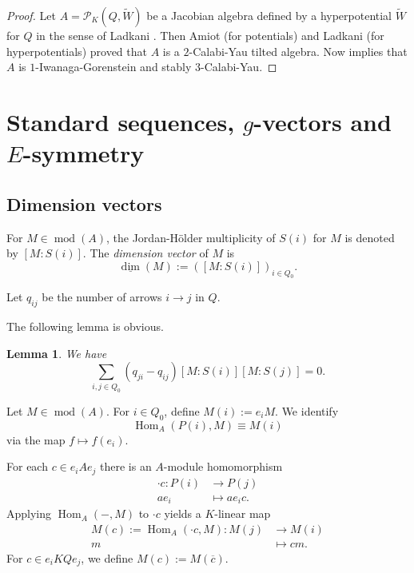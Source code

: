 \documentclass[12pt,reqno]{amsart}
\newtheorem{Lem}[Thm]{Lemma}
\theoremstyle{definition}
\newcommand{\df}{\colon}
\newcommand{\cP}{{\mathcal P}}
\newcommand{\md}{\operatorname{mod}}
\newcommand{\Jacobi}{\cP}
\newcommand{\dimv}{\underline{\dim}}
\newcommand{\Hom}{\operatorname{Hom}}
\begin{document}
\begin{proof}
Let $A = \Jacobi_K(Q,\tilde{W})$ be a Jacobian algebra defined
by a hyperpotential $\tilde{W}$ for $Q$ in the sense of Ladkani \cite{L14}.
Then Amiot \cite[Corollary~3.6]{A09}  (for potentials)
and Ladkani \cite[Section~1.1]{L14} (for hyperpotentials) 
proved that $A$ is a $2$-Calabi-Yau tilted algebra.
Now \cite[Proposition~2.1(d) and Theorem~3.3]{KR07} implies that $A$ is $1$-Iwanaga-Gorenstein and stably
$3$-Calabi-Yau.
\end{proof}



\section{Standard sequences, $g$-vectors and $E$-symmetry}
\label{sec:2}



\subsection{Dimension vectors}
For $M \in \md(A)$, the Jordan-H\"older multiplicity of $S(i)$ 
for $M$ is denoted by $[M:S(i)]$.
The \emph{dimension vector} of $M$ is
$$
\dimv(M) := ([M:S(i)])_{i \in Q_0}.
$$

Let $q_{ij}$ be the number of arrows $i \to j$ in $Q$.

The following lemma is obvious.


\begin{Lem}\label{lem:dimv1}
We have
$$
\sum_{i,j \in Q_0} (q_{ji} - q_{ij}) [M:S(i)] [M:S(j)] = 0.
$$
\end{Lem}




Let $M \in \md(A)$.
For $i \in Q_0$, define $M(i) := e_iM$.
We identify 
$$
\Hom_A(P(i),M) \equiv M(i)
$$ via the map
$f \mapsto f(e_i)$.

For each $c \in e_iAe_j$ there is an $A$-module homomorphism
\begin{align*}
\cdot c \df P(i) &\to P(j)
\\
ae_i &\mapsto ae_ic.
\end{align*}
Applying $\Hom_A(-,M)$ to $\cdot c$ yields a $K$-linear map
\begin{align*}
M(c) := \Hom_A(\cdot c,M)\df M(j) &\to M(i)
\\
m &\mapsto cm.
\end{align*}
For $c \in e_iKQe_j$, we define $M(c) := M(\overline{c})$.
\end{document}
